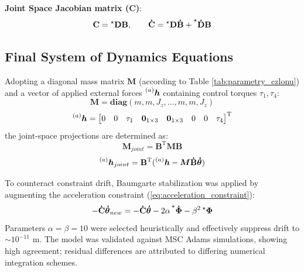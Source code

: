 \textbf{Joint Space Jacobian matrix ($\mathbf{C}$)}:
\begin{equation}
    \label{eq:c_dot_matrix}
    \mathbf{C}=\prescript{\star}{}{\mathbf{D}}\mathbf{B}, \quad \quad \mathbf{\dot C}= \prescript{\star}{}{\mathbf{D}}\mathbf{\dot B} + \prescript{\star}{}{\mathbf{\dot D}}\mathbf{B}
\end{equation}

\subsection{Final System of Dynamics Equations}
Adopting a diagonal mass matrix $\boldsymbol{M}$ (according to Table \ref{tab:parametry_czlonu}) and a vector of applied external forces $\prescript{(a)}{}{\boldsymbol{h}}$ containing control torques $\tau_1, \tau_4$:
\begin{equation}
    \label{eq:mass_matrix}
        \boldsymbol{M} = \boldsymbol{diag}(m, m,J_z, \dots, m, m, J_z)
\end{equation}
\begin{equation}
    \label{eq:h_applied}
        \prescript{(a)}{}{\boldsymbol{h}} = \begin{bmatrix}
            0 & 0 & \tau_1 &\boldsymbol{0}_{1\times3} &\boldsymbol{0}_{1\times3}&0&0 &\tau_4
        \end{bmatrix}^\mathrm{T}
\end{equation}
the joint-space projections are determined as:
\begin{equation}
    \label{eq:mass_matrix_joint}
        \boldsymbol{M}_{joint} = \mathbf{B}^\mathrm{T}\boldsymbol{M}\mathbf{B}
\end{equation}
\begin{equation}
    \label{eq:h_applied_joint}
        \prescript{(a)}{}{\boldsymbol{h}}_{joint} = \mathbf{B}^\mathrm{T}(\prescript{(a)}{}{\boldsymbol{h}} -\boldsymbol{M}\mathbf{\dot B}\boldsymbol{\dot \theta})
\end{equation}

To counteract constraint drift, Baumgarte stabilization \cite{BAUMGARTE19721} was applied by augmenting the acceleration constraint (\ref{eq:acceleration_constraint}):
\begin{equation}
    \label{eq:baumgarte}
    -\mathbf{\dot C}\boldsymbol{\dot \theta}_{new} = -\mathbf{\dot C}\boldsymbol{\dot \theta} -2\alpha \prescript{\star}{}{\boldsymbol{\dot\Phi}}
    -\beta^2\prescript{\star}{}{\boldsymbol{\Phi}}
\end{equation}
Parameters $\alpha = \beta = 10$ were selected heuristically and effectively suppress drift to $\sim10^{-11}$ m. The model was validated against MSC Adams simulations, showing high agreement; residual differences are attributed to differing numerical integration schemes.

